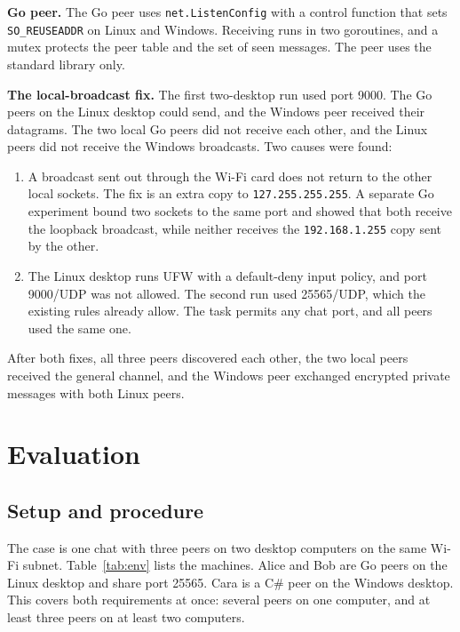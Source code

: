 \documentclass[12pt,a4paper]{article}
\begin{document}
\textbf{Go peer.} The Go peer uses \texttt{net.ListenConfig} with a control function
that sets \texttt{SO\_REUSEADDR} on Linux and Windows. Receiving runs in two
goroutines, and a mutex protects the peer table and the set of seen messages. The
peer uses the standard library only.

\textbf{The local-broadcast fix.} The first two-desktop run used port 9000. The
Go peers on the Linux desktop could send, and the Windows peer received their
datagrams. The two local Go peers did not receive each other, and the Linux peers
did not receive the Windows broadcasts. Two causes were found:
\begin{enumerate}[itemsep=2pt]
  \item A broadcast sent out through the Wi-Fi card does not return to the other
        local sockets. The fix is an extra copy to \texttt{127.255.255.255}. A
        separate Go experiment bound two sockets to the same port and showed that
        both receive the loopback broadcast, while neither receives the
        \texttt{192.168.1.255} copy sent by the other.
  \item The Linux desktop runs UFW with a default-deny input policy, and port
        9000/UDP was not allowed. The second run used 25565/UDP, which the existing
        rules already allow. The task permits any chat port, and all peers used the
        same one.
\end{enumerate}
After both fixes, all three peers discovered each other, the two local peers
received the general channel, and the Windows peer exchanged encrypted private
messages with both Linux peers.

\section{Evaluation}
\subsection{Setup and procedure}
The case is one chat with three peers on two desktop computers on the same Wi-Fi
subnet. Table~\ref{tab:env} lists the machines. Alice and Bob are Go peers on the
Linux desktop and share port 25565. Cara is a C\# peer on the Windows desktop. This
covers both requirements at once: several peers on one computer, and at least three
peers on at least two computers.
\end{document}
